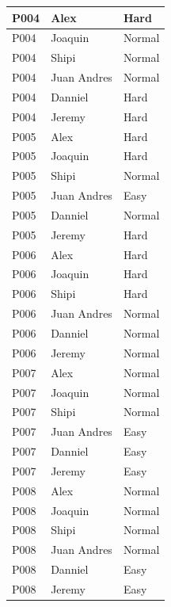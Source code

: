 \begin{longtable}{
    |
    >{\centering\arraybackslash}p{4.5cm}|
    >{\centering\arraybackslash}p{4.5cm}|
    >{\centering\arraybackslash}p{4.5cm}|
}
    P004 & Alex        & Hard \\ \hline
    P004 & Joaquin     & Normal \\ \hline
    P004 & Shipi       & Normal \\ \hline
    P004 & Juan Andres & Normal \\ \hline
    P004 & Danniel     & Hard \\ \hline
    P004 & Jeremy      & Hard \\ \hline

    P005 & Alex        & Hard \\ \hline
    P005 & Joaquin     & Hard \\ \hline
    P005 & Shipi       & Normal \\ \hline
    P005 & Juan Andres & Easy \\ \hline
    P005 & Danniel     & Normal \\ \hline
    P005 & Jeremy      & Hard \\ \hline

    P006 & Alex        & Hard \\ \hline
    P006 & Joaquin     & Hard \\ \hline
    P006 & Shipi       & Hard \\ \hline
    P006 & Juan Andres & Normal \\ \hline
    P006 & Danniel     & Normal \\ \hline
    P006 & Jeremy      & Normal \\ \hline

    P007 & Alex        & Normal \\ \hline
    P007 & Joaquin     & Normal \\ \hline
    P007 & Shipi       & Normal \\ \hline
    P007 & Juan Andres & Easy \\ \hline
    P007 & Danniel     & Easy \\ \hline
    P007 & Jeremy      & Easy \\ \hline

    P008 & Alex        & Normal \\ \hline
    P008 & Joaquin     & Normal \\ \hline
    P008 & Shipi       & Normal \\ \hline
    P008 & Juan Andres & Normal \\ \hline
    P008 & Danniel     & Easy \\ \hline
    P008 & Jeremy      & Easy \\ \hline


\end{longtable}
